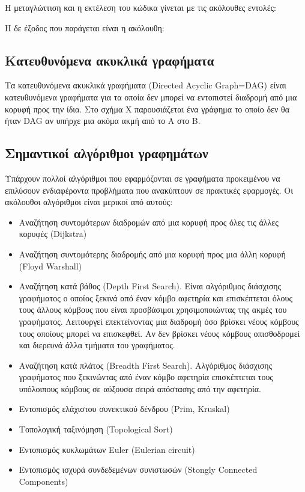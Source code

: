 



Η μεταγλώττιση και η εκτέλεση του κώδικα γίνεται με τις ακόλουθες εντολές:



Η δε έξοδος που παράγεται είναι η ακόλουθη:



\subsection{Κατευθυνόμενα ακυκλικά γραφήματα}
Τα κατευθυνόμενα ακυκλικά γραφήματα (Directed Acyclic Graph=DAG) είναι κατευθυνόμενα γραφήματα για τα οποία δεν μπορεί να εντοπιστεί διαδρομή από μια κορυφή προς την ίδια. Στο σχήμα Χ παρουσιάζεται ένα γράφημα το οποίο δεν θα ήταν DAG αν υπήρχε μια ακόμα ακμή από το Α στο Β.

\subsection{Σημαντικοί αλγόριθμοι γραφημάτων}
Υπάρχουν πολλοί αλγόριθμοι που εφαρμόζονται σε γραφήματα προκειμένου να επιλύσουν ενδιαφέροντα προβλήματα που ανακύπτουν σε πρακτικές εφαρμογές. Οι ακόλουθοι αλγόριθμοι είναι μερικοί από αυτούς:
\begin{itemize}[noitemsep]
	\item Αναζήτηση συντομότερων διαδρομών από μια κορυφή προς όλες τις άλλες κορυφές (Dijkstra)
	\item Αναζήτηση συντομότερης διαδρομής από μια κορυφή προς μια άλλη κορυφή (Floyd Warshall)
	\item Αναζήτηση κατά βάθος (Depth First Search). Είναι αλγόριθμος διάσχισης γραφήματος ο οποίος ξεκινά από έναν κόμβο αφετηρία και επισκέπτεται όλους τους άλλους κόμβους που είναι προσβάσιμοι χρησιμοποιώντας της ακμές του γραφήματος. Λειτουργεί επεκτείνοντας μια διαδρομή όσο βρίσκει νέους κόμβους τους οποίους μπορεί να επισκεφθεί. Αν δεν βρίσκει νέους κόμβους οπισθοδρομεί και διερευνά άλλα τμήματα του γραφήματος.
	\item Αναζήτηση κατά πλάτος (Breadth First Search). Αλγόριθμος διάσχισης γραφήματος που ξεκινώντας από έναν κόμβο αφετηρία επισκέπτεται τους υπόλοιπους κόμβους σε αύξουσα σειρά απόστασης από την αφετηρία. 
	\item Εντοπισμός ελάχιστου συνεκτικού δένδρου (Prim, Kruskal)
	\item Τοπολογική ταξινόμηση (Topological Sort)
	\item Εντοπισμός κυκλωμάτων Euler (Eulerian circuit)
	\item Εντοπισμός ισχυρά συνδεδεμένων συνιστωσών (Stongly Connected Components)
\end{itemize} 

